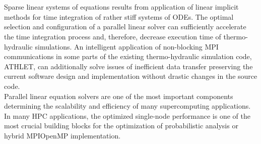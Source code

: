 \chapter{\abstractname}




Sparse linear systems of equations results from application of linear implicit methods for time integration of rather stiff systems of ODEs. The optimal selection and configuration of a parallel linear solver can sufficiently accelerate the time integration process and, therefore, decrease execution time of thermo-hydraulic simulations. An intelligent application of non-blocking MPI communications in some parts of the existing thermo-hydraulic simulation code, ATHLET, can additionally solve issues of inefficient data transfer preserving the current software design and implementation without drastic changes in the source code.\\




Parallel linear equation solvers are one of the most important components determining the scalability and efficiency of many supercomputing applications.\\

In many HPC applications, the optimized single-node performance is one of the most crucial building blocks for the optimization of probabilistic analysis or hybrid MPIOpenMP implementation.




